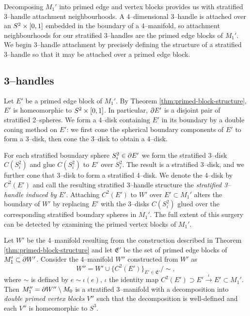 Decomposing $M_1'$ into primed edge and vertex blocks provides us with stratified 3--handle attachment neighbourhoods.
A 4--dimensional 3--handle is attached over an $S^2\times[0,1]$ embedded in the boundary of a 4--manifold, so attachment neighbourhoods for our stratified 3--handles are the primed edge blocks of $M_1'$.
We begin 3--handle attachment by precisely defining the structure of a stratified 3--handle so that it may be attached over a primed edge block.

\subsection{3--handles}

Let $E'$ be a primed edge block of $M_1'$.
By Theorem \ref{thm:primed-block-structure}, $E'$ is homeomorphic to $S^2\times[0,1]$.
In particular, $\partial E'$ is a disjoint pair of stratified 2--spheres.
We form a 4--disk containing $E'$ in its boundary by a double coning method on $E'$: we first cone the spherical boundary components of $E'$ to form a 3--disk, then cone the 3--disk to obtain a 4--disk.


For each stratified boundary sphere $S_i^2\in\partial E'$ we form the stratified 3--disk $C(S_i^2)$ and glue $C(S_i^2)$ to $E'$ over $S_i^2$.
The result is a stratified 3--disk, and we further cone that 3--disk to form a stratified 4--disk.
We denote the 4--disk by $C^2(E')$ and call the resulting stratified 3--handle structure the \emph{stratified 3--handle induced by $E'$}.
Attaching $C^2(E')$ to $W'$ over $E'\subset M_1'$ alters the boundary of $W'$ by replacing $E'$ with the 3--disks $C(S_i^2)$ glued over the corresponding stratified boundary spheres in $M_1'$.
The full extent of this surgery can be detected by examining the primed vertex blocks of $M_1'$.

\begin{cor}
	\label{thm:primed-primed-block-structure}
	Let $W'$ be the 4--manifold resulting from the construction described in Theorem \ref{thm:primed-block-structure} and let $\mathfrak{E}'$ be the set of primed edge blocks of $M_1'\subset\partial W'$.
	Consider the 4--manifold $W''$ constructed from $W'$ as
	\[
	W'' = W'\cup\{C^2(E')\}_{E'\in \mathfrak{E}'} / \sim,
	\]
	where $\sim$ is defined by $e\sim \iota(e)$, $\iota$ the identity map $C^2(E')\supset E'\overset{\iota}{\to} E'\subset M_1'$.
	Then $M_1''=\partial W''\setminus M_0$ is a stratified 3--manifold with a decomposition into \emph{double primed vertex blocks} $V''$ such that the decomposition is well-defined and each $V''$ is homeomorphic to $S^3$.
\end{cor}

